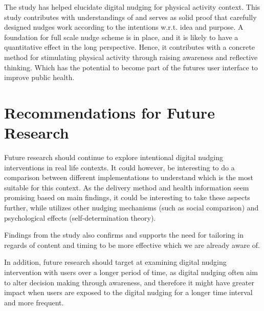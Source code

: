 The study has helped elucidate digital nudging for physical activity context. This study contributes with understandings of and serves as solid proof that carefully designed nudges work according to the intentions w.r.t. idea and purpose. A foundation for full scale nudge scheme is in place, and it is likely to have a quantitative effect in the long perspective. Hence, it contributes with a concrete method for stimulating physical activity through raising awareness and reflective thinking. Which has the potential to become part of the futures user interface to improve public health. 


\section{Recommendations for Future Research}
Future research should continue to explore intentional digital nudging interventions in real life contexts. It could however, be interesting to do a comparison between different implementations to understand which is the most suitable for this context. As the delivery method and health information seem promising based on main findings, it could be interesting to take these aspects further, while utilizes other nudging mechanisms (such as social comparison) and psychological effects (self-determination theory). 

Findings from the study also confirms and supports the need for tailoring in regards of content and timing to be more effective which we are already aware of. 

In addition, future research should target at examining digital nudging intervention with users over a longer period of time, as digital nudging often aim to alter decision making through awareness, and therefore it might have greater impact when users are exposed to the digital nudging for a longer time interval and more frequent.


